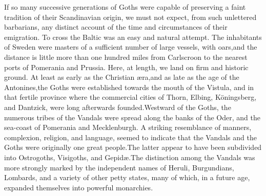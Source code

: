 If so many successive generations of Goths were capable of
preserving a faint tradition of their Scandinavian origin, we
must not expect, from such unlettered barbarians, any distinct
account of the time and circumstances of their emigration. To
cross the Baltic was an easy and natural attempt. The inhabitants
of Sweden were masters of a sufficient number of large vessels,
with oars,\footnotemark[13] and the distance is little more than one hundred
miles from Carlscroon to the nearest ports of Pomerania and
Prussia. Here, at length, we land on firm and historic ground. At
least as early as the Christian æra,\footnotemark[14] and as late as the age of
the Antonines,\footnotemark[15] the Goths were established towards the mouth of
the Vistula, and in that fertile province where the commercial
cities of Thorn, Elbing, Köningsberg, and Dantzick, were long
afterwards founded.\footnotemark[16] Westward of the Goths, the numerous tribes
of the Vandals were spread along the banks of the Oder, and the
sea-coast of Pomerania and Mecklenburgh. A striking resemblance
of manners, complexion, religion, and language, seemed to
indicate that the Vandals and the Goths were originally one great
people.\footnotemark[17] The latter appear to have been subdivided into
Ostrogoths, Visigoths, and Gepidæ.\footnotemark[18] The distinction among the
Vandals was more strongly marked by the independent names of
Heruli, Burgundians, Lombards, and a variety of other petty
states, many of which, in a future age, expanded themselves into
powerful monarchies.\footnotemark[181]






